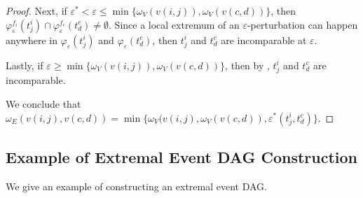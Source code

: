\begin{proof}
    Next, if $\varepsilon^*< \varepsilon \leq \min\{\omega_V(v(i,j)), \omega_V(v(c,d))\}$, then $\varphi_{\varepsilon}^{f_i}(t_j^i) \cap
    \varphi^{f_c}_{\varepsilon}(t_d^c) \neq \emptyset$.  Since a local extremum
    of an $\varepsilon$-perturbation can happen anywhere in
    $\varphi_{\varepsilon}(t_j^i)$ and $\varphi_{\varepsilon}(t_d^c)$, then
    $t_j^i$ and $t_d^c$ are incomparable at $\varepsilon$.

    Lastly, if $\varepsilon\geq\min\{\omega_V(v(i,j)), \omega_V(v(c,d))\}$,
    then by , $t_j^i$ and $t_d^c$ are incomparable.

    We conclude that  $\omega_{E}(v(i,j),
    v(c,d))=\min\{\omega_V(v(i,j), \omega_V(v(c,d)), \varepsilon^*(t_j^i,
    t_d^c)\}$.
\end{proof}

\subsection{Example of Extremal Event DAG Construction}

We give an example of constructing an extremal event DAG.

